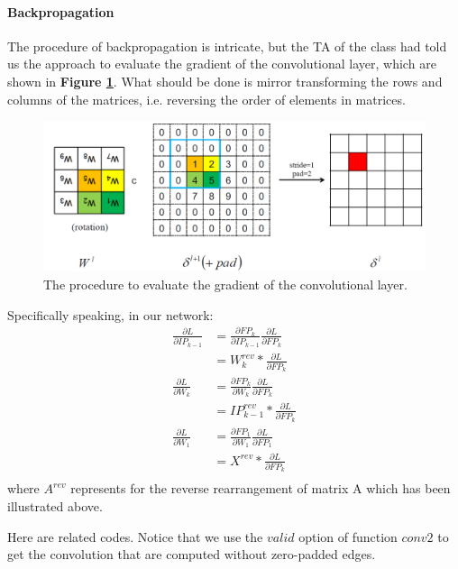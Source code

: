 \documentclass{article}
\begin{document}
\paragraph{Backpropagation}
The procedure of backpropagation is intricate, but the TA of the class had told us the approach to evaluate the gradient of the convolutional layer, which are shown in \textbf{Figure \ref{fig8}}. What should be done is mirror transforming the rows and columns of the matrices, i.e. reversing the order of elements in matrices.

\begin{figure}[H]
	\centering
	\includegraphics[scale=0.5]{figure8}
	\caption{The procedure to evaluate the gradient of the convolutional layer.}
	\label{fig8}
\end{figure}

Specifically speaking, in our network:
\[
\begin{aligned}
\frac{\partial L}{\partial IP_{k-1}}&=\frac{\partial FP_k}{\partial IP_{k-1}}\frac{\partial L}{\partial FP_k}\\
&=W_k^{rev}\ast\frac{\partial L}{\partial FP_k}\\
\frac{\partial L}{\partial W_k}&=\frac{\partial FP_k}{\partial W_k}\frac{\partial L}{\partial FP_k}\\
&=IP_{k-1}^{rev}\ast\frac{\partial L}{\partial FP_k}\\
\frac{\partial L}{\partial W_1}&=\frac{\partial FP_1}{\partial W_1}\frac{\partial L}{\partial FP_1}\\
&=X^{rev}\ast\frac{\partial L}{\partial FP_k}\\
\end{aligned}
\]
where $A^{rev}$ represents for the reverse rearrangement of matrix A which has been illustrated above.\par
Here are related codes. Notice that we use the $valid$ option of function $conv2$ to get the convolution that are computed without zero-padded edges.
\end{document}
